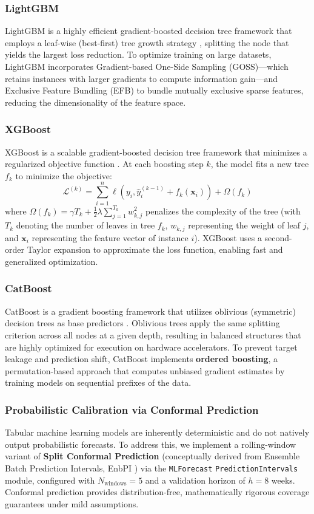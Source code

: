 \subsubsection{LightGBM}
LightGBM is a highly efficient gradient-boosted decision tree framework that employs a leaf-wise (best-first) tree growth strategy \cite{lightgbm}, splitting the node that yields the largest loss reduction. To optimize training on large datasets, LightGBM incorporates Gradient-based One-Side Sampling (GOSS)---which retains instances with larger gradients to compute information gain---and Exclusive Feature Bundling (EFB) to bundle mutually exclusive sparse features, reducing the dimensionality of the feature space.

\subsubsection{XGBoost}
XGBoost is a scalable gradient-boosted decision tree framework that minimizes a regularized objective function \cite{xgboost}. At each boosting step $k$, the model fits a new tree $f_k$ to minimize the objective:
\begin{equation}
\mathcal{L}^{(k)} = \sum_{i=1}^n \ell(y_i, \hat{y}_i^{(k-1)} + f_k(\mathbf{x}_i)) + \Omega(f_k)
\end{equation}
where $\Omega(f_k) = \gamma T_k + \frac{1}{2}\lambda \sum_{j=1}^{T_k} w_{k, j}^2$ penalizes the complexity of the tree (with $T_k$ denoting the number of leaves in tree $f_k$, $w_{k, j}$ representing the weight of leaf $j$, and $\mathbf{x}_i$ representing the feature vector of instance $i$). XGBoost uses a second-order Taylor expansion to approximate the loss function, enabling fast and generalized optimization.

\subsubsection{CatBoost}
CatBoost is a gradient boosting framework that utilizes oblivious (symmetric) decision trees as base predictors \cite{catboost}. Oblivious trees apply the same splitting criterion across all nodes at a given depth, resulting in balanced structures that are highly optimized for execution on hardware accelerators. To prevent target leakage and prediction shift, CatBoost implements \textbf{ordered boosting}, a permutation-based approach that computes unbiased gradient estimates by training models on sequential prefixes of the data.

\subsubsection{Probabilistic Calibration via Conformal Prediction}
Tabular machine learning models are inherently deterministic and do not natively output probabilistic forecasts. To address this, we implement a rolling-window variant of \textbf{Split Conformal Prediction} (conceptually derived from Ensemble Batch Prediction Intervals, EnbPI \cite{xu2021conformal}) via the \texttt{MLForecast} \texttt{PredictionIntervals} module, configured with $N_{\text{windows}}=5$ and a validation horizon of $h=8$ weeks. Conformal prediction provides distribution-free, mathematically rigorous coverage guarantees under mild assumptions.

